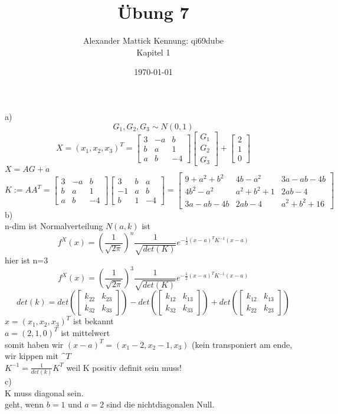 \documentclass{article}
\author{
Alexander Mattick Kennung: qi69dube\\
Kapitel 1
}
\date{\today}
\title{Übung 7}
\begin{document}
	\maketitle
	\section{}
	a)
	\[G_1,G_2,G_3\sim N(0,1)\]
	\[X = (x_1,x_2,x_3)^T =\begin{bmatrix}
	3 & -a & b\\
	b & a  & 1\\
	a & b & -4
	\end{bmatrix} \begin{bmatrix}G_1\\G_2\\G_3 \end{bmatrix}+\begin{bmatrix}2\\1\\0 \end{bmatrix}\]
	$X = AG+a$\\
	\[K := AA^T =\begin{bmatrix}
	3 & -a & b\\
	b & a  & 1\\
	a & b & -4
	\end{bmatrix}\begin{bmatrix}
	3 & b & a\\
	-1 & a  & b\\
	b & 1 & -4
	\end{bmatrix} = \begin{bmatrix}
	9+a^2+b^2 & 4b-a^2 & 3a-ab-4b\\
	4b^2-a^2 & a^2+b^2+1 & 2ab-4\\
	3a-ab-4b &2ab-4 & a^2+b^2+16
	 \end{bmatrix}\]
	b)\\
	n-dim ist Normalverteilung $N(a,k)$ ist\\
	\[f^X(x)= (\frac{1}{\sqrt{2\pi}})^n \frac{1}{\sqrt{det(K)}}e^{-\frac{1}{2}(x-a)^TK^{-1} (x-a)}\]
	hier ist n=3
	\[f^X(x)= (\frac{1}{\sqrt{2\pi}})^3 \frac{1}{\sqrt{det(K)}}e^{-\frac{1}{2}(x-a)^TK^{-1} (x-a)}\]
	\[det(k)  = det(\begin{bmatrix}k_{22}&k_{23}\\k_{32}&k_{33}\end{bmatrix})-det(\begin{bmatrix}k_{12}&k_{13}\\k_{32}&k_{33}\end{bmatrix})+det(\begin{bmatrix}k_{12}&k_{13}\\k_{22}&k_{23}\end{bmatrix})\]
	$x = (x_1,x_2,x_3)^T$ ist bekannt\\
	$a = (2,1,0)^T$ ist mittelwert\\
	somit haben wir $(x-a)^T = (x_1-2,x_2-1,x_3)$ (kein transponiert am ende, wir kippen mit $\^T$\\
	$K^{-1} =\frac{1}{det(k)}K^T$ weil K positiv definit sein muss!\\
	c)\\
	K muss diagonal sein.\\
	geht, wenn $b=1$ und $a=2$ sind die nichtdiagonalen Null.\\
\end{document}
